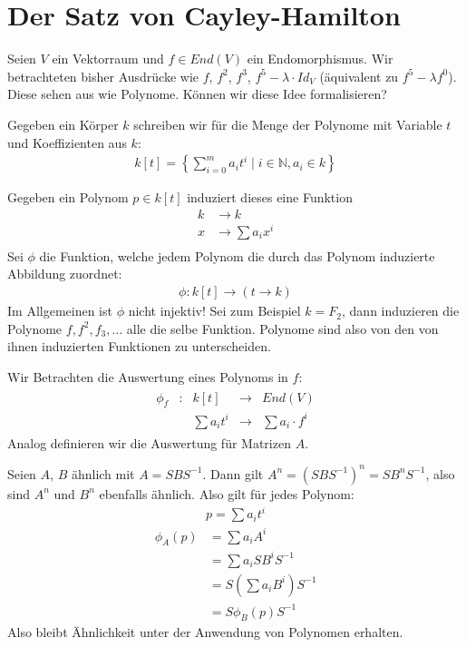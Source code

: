 \documentclass{report}
\newcommand{\bN}{\mathbb{N}}
\begin{document}
\section{Der Satz von Cayley-Hamilton}
Seien $V$ ein Vektorraum und $f \in End(V)$ ein Endomorphismus. Wir betrachteten bisher Ausdrücke wie $f$, $f^2$, $f^3$, $f^5 - \lambda \cdot Id_V$ (äquivalent zu $f^5 - \lambda f^0$). Diese sehen aus wie Polynome. Können wir diese Idee formalisieren?
\begin{definition}
 Gegeben ein Körper $k$ schreiben wir für die Menge der Polynome mit Variable $t$ und Koeffizienten aus $k$:
 \begin{align*}
  k[t] = \left\{\sum_{i=0}^m a_i t^i \mid i \in \bN, a_i \in k\right\}
 \end{align*}
\end{definition}
\begin{anmerkung}
Gegeben ein Polynom $p \in k[t]$ induziert dieses eine Funktion 
\begin{align*}
 k &\to k\\
 x &\to \sum a_i x^i\\
\end{align*}
Sei $\phi$ die Funktion, welche jedem Polynom die durch das Polynom induzierte Abbildung zuordnet:
\begin{align*}
 \phi : k[t] \to (t \to k)
\end{align*}
Im Allgemeinen ist $\phi$ nicht injektiv! Sei zum Beispiel $k = F_2$, dann induzieren die Polynome $f, f^2, f_3, \hdots$ alle die selbe Funktion. Polynome sind also von den von ihnen induzierten Funktionen zu unterscheiden. 
\end{anmerkung}
\begin{definition}
 Wir Betrachten die Auswertung eines Polynoms in $f$:
 \begin{align*}
 \begin{array}{ccccc}
  \phi_f & : & k[t] &\to& End(V)\\
       & &\sum a_i t^i &\to& \sum a_i \cdot f^i
 \end{array}
 \end{align*}
 Analog definieren wir die Auswertung für Matrizen $A$.
\end{definition}
\begin{beobachtung}
 Seien $A$, $B$ ähnlich mit $A = S B S^{-1}$. Dann gilt $A^n = (S B S^{-1})^n = S B^n S^{-1}$, also sind $A^n$ und $B^n$ ebenfalls ähnlich. Also gilt für jedes Polynom:
 \begin{align*}
  p = \sum a_i t^i
 \end{align*}
 \begin{align*}
  \phi_A(p) &= \sum a_i A^i\\ &= \sum a_i S B^i S^{-1}\\ &= S \left(\sum a_i B^i\right) S^{-1}\\ &= S \phi_B(p) S^{-1}
 \end{align*}
 Also bleibt Ähnlichkeit unter der Anwendung von Polynomen erhalten.
\end{beobachtung}
\end{document}
